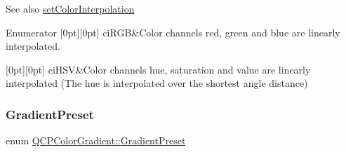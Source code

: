 \begin{DoxySeeAlso}{See also}
\hyperlink{class_q_c_p_color_gradient_aa13fda86406e1d896a465a409ae63b38}{set\+Color\+Interpolation} 
\end{DoxySeeAlso}
\begin{DoxyEnumFields}{Enumerator}
[0pt][0pt]{}\mbox{\label{class_q_c_p_color_gradient_ac5dca17cc24336e6ca176610e7f77fc1a5e30f725c9cfe93999e268a9f92afbe7}} 
ci\+R\+GB&Color channels red, green and blue are linearly interpolated. \\
\hline

[0pt][0pt]{}\mbox{\label{class_q_c_p_color_gradient_ac5dca17cc24336e6ca176610e7f77fc1af14ae62fcae11ecc07234eeaec5856cb}} 
ci\+H\+SV&Color channels hue, saturation and value are linearly interpolated (The hue is interpolated over the shortest angle distance) \\
\hline

\end{DoxyEnumFields}
\mbox{\label{class_q_c_p_color_gradient_aed6569828fee337023670272910c9072}} 
\subsubsection{\texorpdfstring{Gradient\+Preset}{GradientPreset}}
{\footnotesize\ttfamily enum \hyperlink{class_q_c_p_color_gradient_aed6569828fee337023670272910c9072}{Q\+C\+P\+Color\+Gradient\+::\+Gradient\+Preset}}

